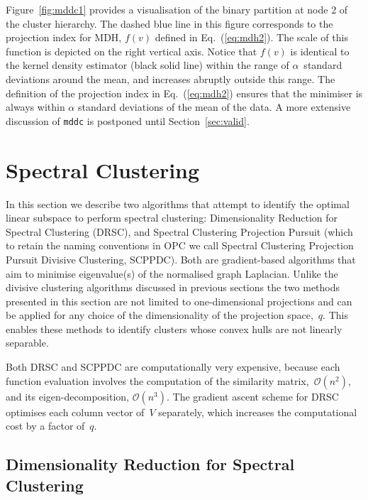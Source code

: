 \documentclass{book}
\begin{document}
\noindent
%
Figure~\ref{fig:mddc1} provides a visualisation of the binary partition at node 2 of
the cluster hierarchy.  The dashed blue line in this figure corresponds to the projection
index for MDH, $f(v)$ defined in Eq.~(\ref{eq:mdh2}). The scale of this function is
depicted on the right vertical axis.
%
Notice that $f(v)$ is identical to the kernel density estimator (black solid line) within the range
of $\alpha$~standard deviations around the mean, and increases abruptly outside this range. 
%
The definition of the projection index in
Eq.~(\ref{eq:mdh2}) ensures that the minimiser is always
within $\alpha$ standard deviations of the mean of the data.
%
A more extensive discussion of {\tt mddc} is postponed until Section~\ref{sec:valid}.

\section{Spectral Clustering}

In this section we describe two algorithms that attempt to identify the optimal
linear subspace to perform spectral clustering: Dimensionality Reduction for
Spectral Clustering (DRSC), and Spectral Clustering Projection Pursuit (which
to retain the naming conventions in OPC we call Spectral Clustering Projection
Pursuit Divisive Clustering, SCPPDC).
%
Both are gradient-based algorithms that aim to minimise eigenvalue(s) of the
normalised graph Laplacian.
%
Unlike the divisive clustering algorithms discussed in previous sections
the two methods presented in this section are not limited to
one-dimensional projections and can be applied for any choice of the
dimensionality of the projection space,~$q$.
%
This enables these methods to identify clusters whose convex hulls
are not linearly separable.


Both DRSC and SCPPDC are computationally very expensive, because each function
evaluation involves the computation of the similarity
matrix,~$\mathcal{O}(n^2)$, and its eigen-decomposition, $\mathcal{O}(n^3)$.
%
The gradient ascent scheme for DRSC optimises each column vector of~$V$
separately, which increases the computational cost by a factor of~$q$.


\subsection{Dimensionality Reduction for Spectral Clustering}
\end{document}

